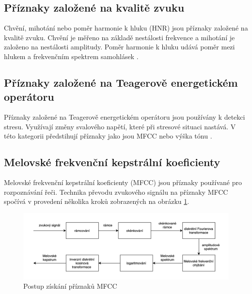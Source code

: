 \documentclass[FM,BP]{tulthesis}
\begin{document}
\subsection{Příznaky založené na kvalitě zvuku}  %
Chvění, mihotání nebo poměr harmonie k hluku (HNR) jsou příznaky založené na kvalitě zvuku. Chvění je měřeno na základě nestálosti frekvence a mihotání je založeno na nestálosti amplitudy. Poměr harmonie k hluku udává poměr mezi hlukem a frekvenčním spektrem samohlásek \cite{DBLP:journals/speech/AkcayO20}.

\subsection{Příznaky založené na Teagerově energetickém operátoru}  %
Příznaky založené na Teagerově energetickém operátoru jsou používány k detekci stresu. Využívají změny svalového napětí, které při stresové situaci nastává. V této kategorii předstihují příznaky jako jsou MFCC nebo výška tónu \cite{DBLP:journals/speech/AkcayO20}.

\subsection{Melovské frekvenční kepstrální koeficienty} %
Melovské frekvenční kepstrální koeficienty (MFCC) jsou příznaky používané pro rozpoznávání řeči. Technika převodu zvukového signálu na příznaky MFCC spočívá v provedení několika kroků zobrazených na obrázku \ref{fig:mfcc_pipeline}. 

\begin{figure}[htbp]
\centerline{\includegraphics[width=\textwidth,height=\textheight,keepaspectratio]{mfcc_pipeline.png}}
\caption{Postup získání příznaků MFCC}
\label{fig:mfcc_pipeline}
\end{figure}
\FloatBarrier
\end{document}
